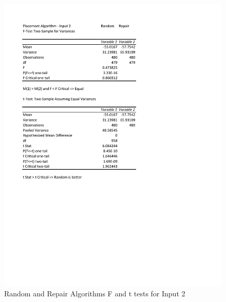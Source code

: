 \documentclass[times]{article}
\begin{document}
	\begin{figure}
		\caption{Random and Repair Algorithms F and t tests for Input 2}
		\label{fig:random_repair2}
		\includegraphics[width=\textwidth]{./t_test/Random_Repair2}
	\end{figure}
\end{document}

